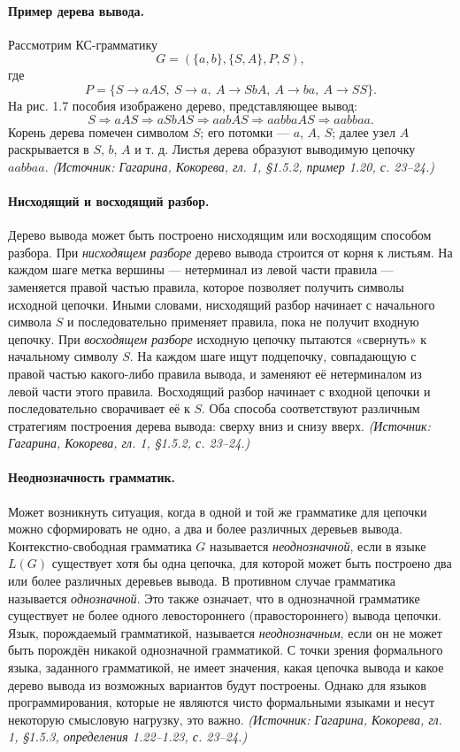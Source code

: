 \documentclass[a4paper,12pt]{article}
\begin{document}
\paragraph{Пример дерева вывода.}
Рассмотрим КС-грамматику
\[
G=(\{a,b\},\{S,A\},P,S),
\]
где
\[
P=\{S\to aAS,\ S\to a,\ A\to SbA,\ A\to ba,\ A\to SS\}.
\]
На рис. 1.7 пособия изображено дерево, представляющее вывод:
\[
S\Rightarrow aAS\Rightarrow aSbAS\Rightarrow aabAS\Rightarrow aabbaAS\Rightarrow aabbaa.
\]
Корень дерева помечен символом \(S\); его потомки — \(a\), \(A\), \(S\); далее узел \(A\) раскрывается в \(S\), \(b\), \(A\) и т. д. Листья дерева образуют выводимую цепочку \(aabbaa\).
\textit{(Источник: Гагарина, Кокорева, гл. 1, §1.5.2, пример 1.20, с. 23--24.)}

\paragraph{Нисходящий и восходящий разбор.}
Дерево вывода может быть построено нисходящим или восходящим способом разбора. При \emph{нисходящем разборе} дерево вывода строится от корня к листьям. На каждом шаге метка вершины — нетерминал из левой части правила — заменяется правой частью правила, которое позволяет получить символы исходной цепочки. Иными словами, нисходящий разбор начинает с начального символа \(S\) и последовательно применяет правила, пока не получит входную цепочку. При \emph{восходящем разборе} исходную цепочку пытаются «свернуть» к начальному символу \(S\). На каждом шаге ищут подцепочку, совпадающую с правой частью какого-либо правила вывода, и заменяют её нетерминалом из левой части этого правила. Восходящий разбор начинает с входной цепочки и последовательно сворачивает её к \(S\). Оба способа соответствуют различным стратегиям построения дерева вывода: сверху вниз и снизу вверх.
\textit{(Источник: Гагарина, Кокорева, гл. 1, §1.5.2, с. 23--24.)}

\paragraph{Неоднозначность грамматик.}
Может возникнуть ситуация, когда в одной и той же грамматике для цепочки можно сформировать не одно, а два и более различных деревьев вывода. Контекстно-свободная грамматика \(G\) называется \emph{неоднозначной}, если в языке \(L(G)\) существует хотя бы одна цепочка, для которой может быть построено два или более различных деревьев вывода. В противном случае грамматика называется \emph{однозначной}. Это также означает, что в однозначной грамматике существует не более одного левостороннего (правостороннего) вывода цепочки. Язык, порождаемый грамматикой, называется \emph{неоднозначным}, если он не может быть порождён никакой однозначной грамматикой. С точки зрения формального языка, заданного грамматикой, не имеет значения, какая цепочка вывода и какое дерево вывода из возможных вариантов будут построены. Однако для языков программирования, которые не являются чисто формальными языками и несут некоторую смысловую нагрузку, это важно.
\textit{(Источник: Гагарина, Кокорева, гл. 1, §1.5.3, определения 1.22--1.23, с. 23--24.)}
\end{document}
